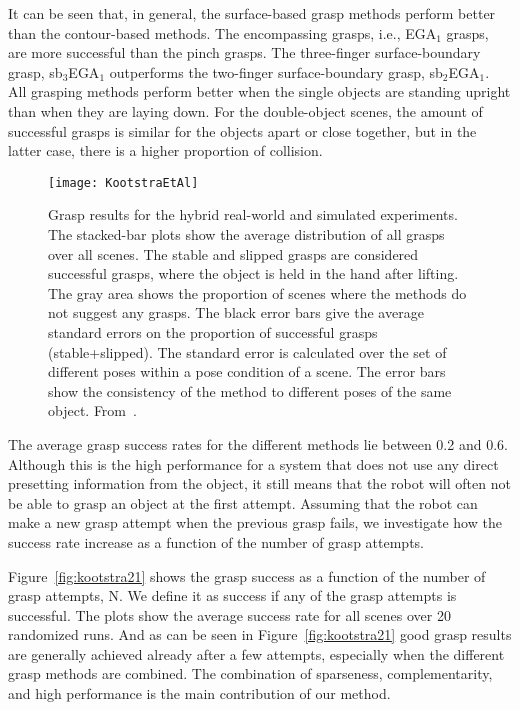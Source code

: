 It can be seen that, in general, the surface-based grasp methods perform better than the contour-based methods. 
The encompassing grasps, i.e., EGA$_1$ grasps, are more successful than the pinch grasps. 
The three-finger surface-boundary grasp, sb$_3$EGA$_1$ outperforms the two-finger surface-boundary grasp, sb$_2$EGA$_1$. 
All grasping methods perform better when the single objects are standing upright than when they are laying down. 
For the double-object scenes, the amount of successful grasps is similar for the objects apart or close together, 
but in the latter case, there is a higher proportion of collision. 

\begin{figure}
	\centering
	\texttt{[image: KootstraEtAl]}
	\caption{Grasp results for the hybrid real-world and simulated experiments. 
		The stacked-bar plots show the average distribution of all grasps over all scenes. 
		The stable and slipped grasps are considered successful grasps, where the object is held in the hand after lifting. 
		The gray area shows the proportion of scenes where the methods do not suggest any grasps. 
		The black error bars give the average standard errors on the proportion of successful grasps (stable+slipped). 
		The standard error is calculated over the set of different poses within a pose condition of a scene.
		 The error bars show the consistency of the method to different poses of the same object. From~\cite{kootstra}.}
	\label{fig:kootstra20}
\end{figure}

The average grasp success rates for the different methods lie between 0.2 and 0.6. 
Although this is the high performance for a system that does not use any direct presetting information from the object, 
it still means that the robot will often not be able to grasp an object at the first attempt. 
Assuming that the robot can make a new grasp attempt when the previous grasp fails, we investigate how the success rate increase as a function of the number of grasp attempts.
 
Figure~\vref{fig:kootstra21} shows the grasp success as a function of the number of grasp attempts, N.
We define it as success if any of the grasp attempts is successful. 
The plots show the average success rate for all scenes over 20 randomized runs.
And as can be seen in Figure~\vref{fig:kootstra21} good grasp results are generally achieved already after a few attempts,
especially when the different grasp methods are combined. The combination of sparseness, complementarity,
and high performance is the main contribution of our method.
 
